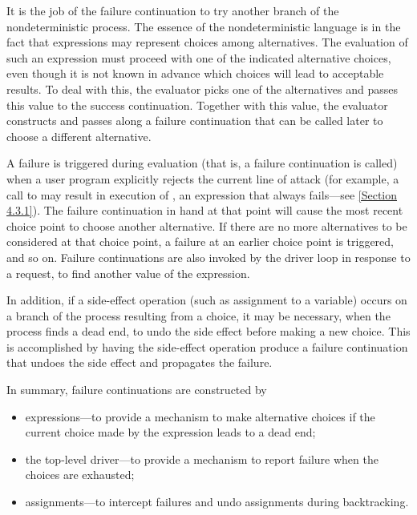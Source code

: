 It is the job of the failure continuation to try another branch of the nondeterministic process.
The essence of the nondeterministic language is in the fact that expressions may represent choices among alternatives.
The evaluation of such an expression must proceed with one of the indicated alternative choices, even though it is not known in advance which choices will lead to acceptable results.
To deal with this, the evaluator picks one of the alternatives and passes this value to the success continuation.
Together with this value, the evaluator constructs and passes along a failure continuation that can be called later to choose a different alternative.

A failure is triggered during evaluation (that is, a failure continuation is called) when a user program explicitly rejects the current line of attack (for example, a call to  may result in execution of , an expression that always fails---see \cref{Section 4.3.1}).
The failure continuation in hand at that point will cause the most recent choice point to choose another alternative.
If there are no more alternatives to be considered at that choice point, a failure at an earlier choice point is triggered, and so on.
Failure continuations are also invoked by the driver loop in response to a  request, to find another value of the expression.

In addition, if a side-effect operation (such as assignment to a variable) occurs on a branch of the process resulting from a choice, it may be necessary, when the process finds a dead end, to undo the side effect before making a new choice.
This is accomplished by having the side-effect operation produce a failure continuation that undoes the side effect and propagates the failure.

In summary, failure continuations are constructed by
\begin{itemize}

	\item
		 expressions---to provide a mechanism to make alternative choices if the current choice made by the  expression leads to a dead end;

	\item
		the top-level driver---to provide a mechanism to report failure when the choices are exhausted;

	\item
		assignments---to intercept failures and undo assignments during backtracking.

\end{itemize}


